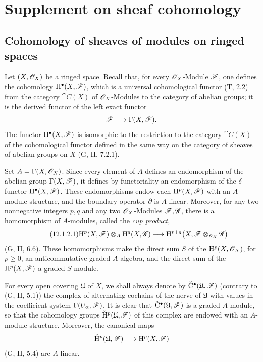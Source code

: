 \section{Supplement on sheaf cohomology}
\label{section:0.12}

\subsection{Cohomology of sheaves of modules on ringed spaces}
\label{subsection:0.12.1}

\begin{env}[12.1.1]
\label{0.12.1.1}
Let $(X,\mathscr{O}_X)$ be a ringed space.
Recall that, for every $\mathscr{O}_X$-Module $\mathscr{F}$, one defines the
cohomology $\mathrm{H}^\bullet(X,\mathscr{F})$, which is a universal cohomological
functor (T, 2.2) from the category $\cat{C}(X)$ of
$\mathscr{O}_X$-Modules to the category of abelian groups; it is the derived
functor of the left exact functor
\[
  \mathscr{F}\longmapsto\Gamma(X,\mathscr{F}).
\]
The functor $\mathrm{H}^\bullet(X,\mathscr{F})$ is isomorphic
to the restriction to the category $\cat{C}(X)$ of the cohomological
functor defined in the same way on the category of sheaves of abelian
groups on $X$ (G, II, 7.2.1).
\end{env}

\begin{env}[12.1.2]
\label{0.12.1.2}
Set $A=\Gamma(X,\mathscr{O}_X)$.
Since every element of $A$ defines an endomorphism of the abelian group
$\Gamma(X,\mathscr{F})$, it defines by functoriality an endomorphism of the
$\delta$-functor $\mathrm{H}^\bullet(X,\mathscr{F})$.
These endomorphisms endow each $\mathrm{H}^p(X,\mathscr{F})$ with an
$A$-module structure, and the boundary operator $\partial$ is
$A$-linear.
Moreover, for any two nonnegative integers $p,q$ and any two
$\mathscr{O}_X$-Modules $\mathscr{F},\mathscr{G}$, there is a homomorphism of
$A$-modules, called the \emph{cup product},
\[
\label{0.12.1.2.1}
\tag{12.1.2.1}
  \mathrm{H}^p(X,\mathscr{F})\otimes_A\mathrm{H}^q(X,\mathscr{G})
  \longrightarrow
  \mathrm{H}^{p+q}\bigl(X,\mathscr{F}\otimes_{\mathscr{O}_X}\mathscr{G}\bigr)
\]
(G, II, 6.6).
These homomorphisms make the direct sum $S$ of the
$\mathrm{H}^p(X,\mathscr{O}_X)$, for $p\geq0$, an anticommutative graded
$A$-algebra, and the direct sum of the $\mathrm{H}^p(X,\mathscr{F})$ a graded
$S$-module.

For every open covering $\mathfrak{U}$ of $X$, we shall always denote
by $\check{\mathrm{C}}^\bullet(\mathfrak{U},\mathscr{F})$ (contrary to
(G, II, 5.1)) the complex of alternating cochains of the nerve of
$\mathfrak{U}$ with values in the coefficient system
$\Gamma(U_\alpha,\mathscr{F})$.
It is clear that
$\check{\mathrm{C}}^\bullet(\mathfrak{U},\mathscr{F})$ is a graded
$A$-module, so that the cohomology groups
$\check{\mathrm{H}}^p(\mathfrak{U},\mathscr{F})$ of this complex are endowed with
an $A$-module structure.
Moreover, the canonical maps
\[
  \check{\mathrm{H}}^p(\mathfrak{U},\mathscr{F})
  \longrightarrow
  \mathrm{H}^p(X,\mathscr{F})
\]
(G, II, 5.4) are $A$-linear.
\end{env}


